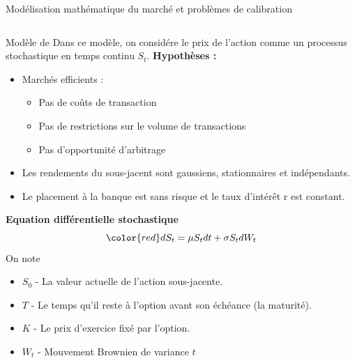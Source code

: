 \documentclass[final]{beamer}
\newlength{\onecolwid}
\newlength{\twocolwid}
\begin{document}
\begin{frame}[t]
\begin{columns}[t]
\begin{column}{\twocolwid} %

\begin{block}{Modélisation mathématique du marché et problèmes de calibration}

\begin{columns}[t,totalwidth=\twocolwid] %

\begin{column}{\onecolwid} %


\begin{alertblock}{Modèle de }
  Dans ce modèle, on considére le prix de l'action comme un processus stochastique en temps continu $S_t$. \newline
  \textbf{Hypothèses :}
  \begin{itemize}
    \item  Marchés efficients :
    \begin{itemize}
      \item Pas de coûts de transaction
      \item Pas de restrictions sur le volume de transactions
      \item Pas d'opportunité d'arbitrage
    \end{itemize}
    \item Les rendements du sous-jacent sont gaussiens, stationnaires et indépendants.
    \item Le placement à la banque est sans risque et le taux d'intérêt r est constant.
  \end{itemize}
  \textbf{Equation différentielle stochastique}
  \[ {\color{red} dS_t = \mu S_t dt + \sigma S_t dW_t} \]
On note \begin{itemize}
      \item $S_0$ - La valeur actuelle de l'action sous-jacente.
      \item $T$ - Le temps qu'il reste à l'option avant son échéance (la maturité).
      \item $K$ - Le prix d'exercice fixé par l'option.
      \item $W_t$ - Mouvement Brownien de variance $t$
\end{itemize}
\end{alertblock}


\end{column}
\end{columns}
\end{block}
\end{column}
\end{columns}
\end{frame}
\end{document}
